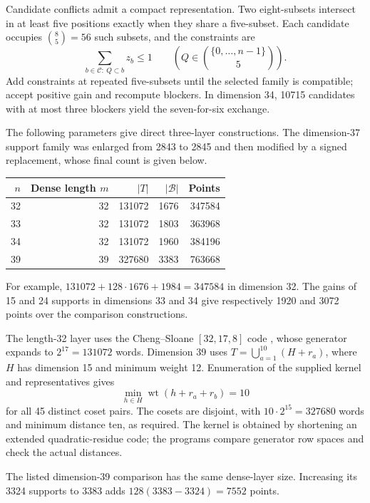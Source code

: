 Candidate conflicts admit a compact representation. Two eight-subsets
intersect in at least five positions exactly when they share a five-subset.
Each candidate occupies $\binom85=56$ such subsets, and the constraints are
\[
\sum_{b\in\mathcal C:\ Q\subset b}z_b\le1
\qquad\left(Q\in\binom{\{0,\ldots,n-1\}}5\right).
\]
Add constraints at repeated five-subsets until the selected family is
compatible; accept positive gain and recompute blockers. In dimension 34,
10715 candidates with at most three blockers yield the seven-for-six exchange.

The following parameters give direct three-layer constructions. The
dimension-37 support family was enlarged from 2843 to 2845 and then
modified by a signed replacement, whose final count is given below.
\begin{center}
\begin{minipage}{\linewidth}\centering
{}
\label{tab:code-parameters}
\begin{tabular}{rrrrr}
\toprule
$n$ & Dense length $m$ & $|T|$ & $|\mathcal B|$ & Points\\
\midrule
32&32&131072&1676&347584\\
33&32&131072&1803&363968\\
34&32&131072&1960&384196\\
39&39&327680&3383&763668\\
\bottomrule
\end{tabular}
\end{minipage}
\end{center}
For example,
$131072+128\cdot1676+1984=347584$ in dimension 32.
The gains of 15 and 24 supports in dimensions 33 and 34 give respectively
1920 and 3072 points over the comparison constructions.

The length-32 layer uses the Cheng--Sloane $[32,17,8]$ code
\cite{chengsloane}, whose generator expands to $2^{17}=131072$ words.
Dimension 39 uses $T=\bigcup_{a=1}^{10}(H+r_a)$, where $H$ has dimension
15 and minimum weight 12. Enumeration of the supplied kernel and
representatives gives
\[
\min_{h\in H}\operatorname{wt}(h+r_a+r_b)=10
\]
for all 45 distinct coset pairs. The cosets are disjoint, with
$10\cdot2^{15}=327680$ words and minimum distance ten, as required.
The kernel is obtained by shortening an extended quadratic-residue code;
the programs compare generator row spaces and check the actual distances.

The listed dimension-39 comparison has the same dense-layer size.
Increasing its 3324 supports to 3383 adds $128(3383-3324)=7552$ points.

